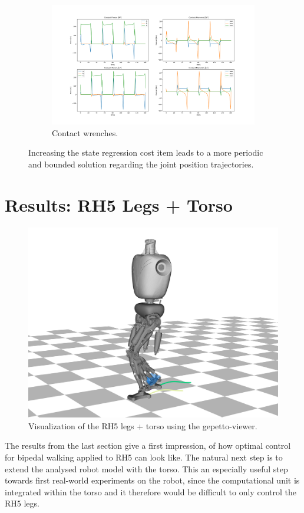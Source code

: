 \begin{figure}[h!]\ContinuedFloat
\begin{subfigure}{1\textwidth}
  \centering
\includegraphics[width=1\linewidth]{Media/Crocoddyl/RH5Legs/FixedPeriodicity/RH5PeriodicGait_ContactWrenches.png}
\caption{Contact wrenches.}
\end{subfigure}
\caption{Increasing the state regression cost item leads to a more periodic and bounded solution regarding the joint position trajectories.}
\label{fig:rh5_periodic}
\centering
\end{figure}



\section{Results: RH5 Legs + Torso}
\begin{figure}[h!]
\centering
\includegraphics[width=1\linewidth]{Media/Crocoddyl/crocoddylRH5Torso.png}
\caption{Visualization of the RH5 legs + torso using the gepetto-viewer.}
\end{figure}
The results from the last section give a first impression, of how optimal control for bipedal walking applied to RH5 can look like. The natural next step is to extend the analysed robot model with the torso. This an especially useful step towards first real-world experiments on the robot, since the computational unit is integrated within the torso and it therefore would be difficult to only control the RH5 legs. 

